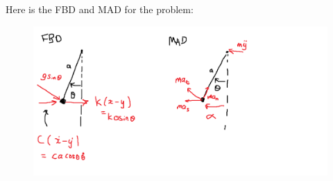 \subsection{}
Here is the FBD and MAD for the problem:
\begin{figure}[H]
    \centering
    \includegraphics[width=0.8\linewidth]{Questions/Figures/Q1 FBD MAD.png}
\end{figure}

